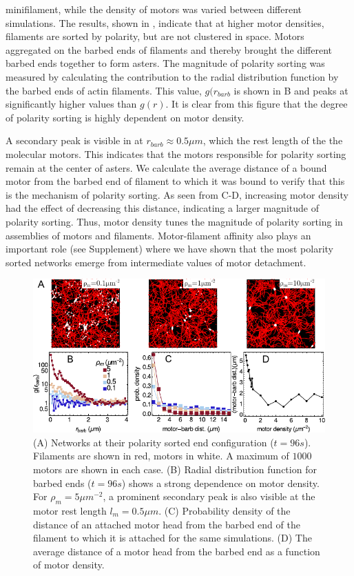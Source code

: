 \documentclass[12pt]{article}
\begin{document}
minifilament, while the density of motors was varied between different
simulations. The results, shown in , indicate that at
higher motor densities, filaments are sorted by polarity, but are 
not clustered in space. Motors aggregated on the barbed ends of filaments
and thereby brought the different barbed ends together to form asters.
The magnitude of polarity sorting was measured by calculating the contribution 
to the radial distribution function by the barbed ends of actin filaments.
This value, $g(r_{barb}$ is shown in B and peaks at
significantly higher values than $g(r)$. It is clear from this 
figure that the degree of polarity sorting is highly dependent on motor density.
\par
A secondary peak is visible in  at 
$r_{barb}\approx0.5\mu m$, which the rest length of the the molecular motors. 
This indicates that the motors responsible for polarity sorting remain at the 
center of asters. We calculate the average distance of a bound motor from the 
barbed end of filament to which it was bound to verify that this is the 
mechanism of polarity sorting. 
As seen from C-D, increasing motor density had the
effect of decreasing this distance, indicating a larger magnitude of polarity
sorting. Thus, motor density tunes the magnitude of polarity sorting in 
assemblies of motors and filaments. Motor-filament affinity also plays an 
important role (see Supplement) where we have shown that the most polarity 
sorted networks emerge from intermediate values of motor detachment. 
\begin{figure}[H] 
\centering
    \includegraphics[scale=1.2] {figs/polarity_sorting/ps_fig.pdf}
  \caption{%
  \label{fig:polarity_sorting}%
  (A) Networks at their polarity sorted end configuration ($t=96s$). 
  Filaments are shown in red, motors in white. A maximum of $1000$ motors are
  shown in each case.
 (B) Radial distribution function for barbed ends ($t=96s$) shows a strong 
 dependence on motor density. For $\rho_m=5\mu m^{-2}$, a prominent secondary 
 peak is also visible at the motor rest length $l_m=0.5\mu m$.
 (C) Probability density of the distance of an attached motor
   head from the barbed end of the filament to which it is attached for the same
   simulations.
 (D) The average distance of a motor head from the barbed end as a function of
 motor density.
 } 
 \end{figure}
\end{document}
